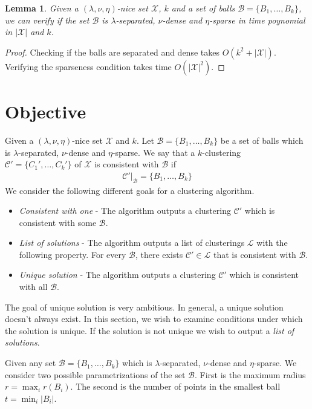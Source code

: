 \documentclass[twoside]{article}
\newcommand{\mc}{\mathcal}
\newtheorem{lemma}[theorem]{Lemma}
\begin{document}
\vspace{1mm}
\begin{lemma}
\label{lemma:chknice}
Given a $(\lambda,\nu, \eta)$-nice set $\mc X$, $k$ and a set of balls $\mc B = \{B_1,\ldots,B_k\}$, we can verify if the set $\mc B$ is $\lambda$-separated, $\nu$-dense and $\eta$-sparse in time poynomial in $|\mc X|$ and $k$.
\end{lemma}
\begin{proof}
Checking if the balls are separated and dense takes $O(k^2 + |\mc X|)$. Verifying the sparseness condition takes time $O(|\mc X|^2)$.
\end{proof}

\section{Objective}
Given a $(\lambda, \nu, \eta)$-nice set $\mc X$ and $k$. Let $\mc B = \{B_1,\ldots,B_k\}$ be a set of balls which is $\lambda$-separated, $\nu$-dense and $\eta$-sparse. We say that a $k$-clustering $\mc C' =\{C_1',\ldots,C_k'\}$ of $\mc X$ is consistent with $\mc B$ if
\begin{align*}
	\mc C'|_\mc B = \{B_1,\ldots,B_k\}
\end{align*}
We consider the following different goals for a clustering algorithm. 
\begin{itemize}[noitemsep,nolistsep]
\item {\em Consistent with one} - The algorithm outputs a clustering $\mc C'$ which is consistent with some $\mc B$.
\item {\em List of solutions} - The algorithm outputs a list of clusterings $\mc L$ with the following property. For every $\mc B$, there exists $\mc C' \in \mc L$ that is consistent with $\mc B$.
\item {\em Unique solution} - The algorithm outputs a clustering $\mc C'$ which is consistent with all $\mc B$.
\end{itemize}

The goal of unique solution is very ambitious. In general, a unique solution doesn't always exist. In this section, we wish to examine conditions under which the solution is unique. If the solution is not unique we wish to output a {\em list of solutions}.  

Given any set $\mc B = \{B_1,\ldots, B_k\}$ which is $\lambda$-separated, $\nu$-dense and $\eta$-sparse. We consider two possible parametrizations of the set $\mc B$. First is the maximum radius $r = \max_i r(B_i)$. The second is the number of points in the smallest ball $t = \min_i |B_i|$.
\end{document}
